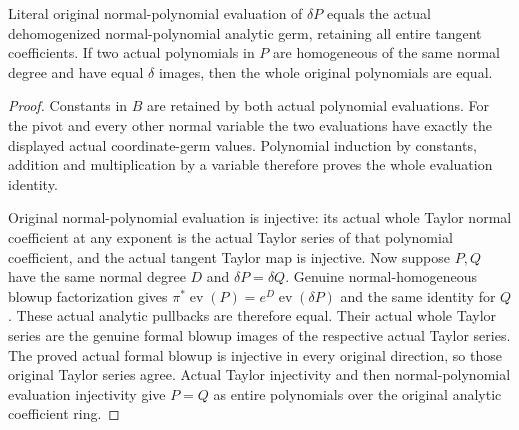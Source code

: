 \begin{theorem}
\label{hir:actual-relative-homogeneous-dehomogenization-injective}
\leanok
Literal original normal-polynomial evaluation of $\delta P$ equals
the actual dehomogenized normal-polynomial analytic germ, retaining all
entire tangent coefficients. If two actual polynomials in $P$ are
homogeneous of the same normal degree and have equal $\delta$ images,
then the whole original polynomials are equal.
\end{theorem}
\begin{proof}
Constants in $B$ are retained by both actual polynomial evaluations.
For the pivot and every other normal variable the two evaluations have
exactly the displayed actual coordinate-germ values. Polynomial
induction by constants, addition and multiplication by a variable
therefore proves the whole evaluation identity.

Original normal-polynomial evaluation is injective: its actual whole
Taylor normal coefficient at any exponent is the actual Taylor series
of that polynomial coefficient, and the actual tangent Taylor map is
injective. Now suppose $P,Q$ have the same normal degree $D$ and
$\delta P=\delta Q$. Genuine normal-homogeneous blowup factorization
gives $\pi^*\operatorname{ev}(P)=e^D\operatorname{ev}(\delta P)$
and the same identity for $Q$. These actual analytic pullbacks are
therefore equal. Their actual whole Taylor series are the genuine
formal blowup images of the respective actual Taylor series. The
proved actual formal blowup is injective in every original direction,
so those original Taylor series agree. Actual Taylor injectivity and
then normal-polynomial evaluation injectivity give $P=Q$ as entire
polynomials over the original analytic coefficient ring.
\end{proof}

